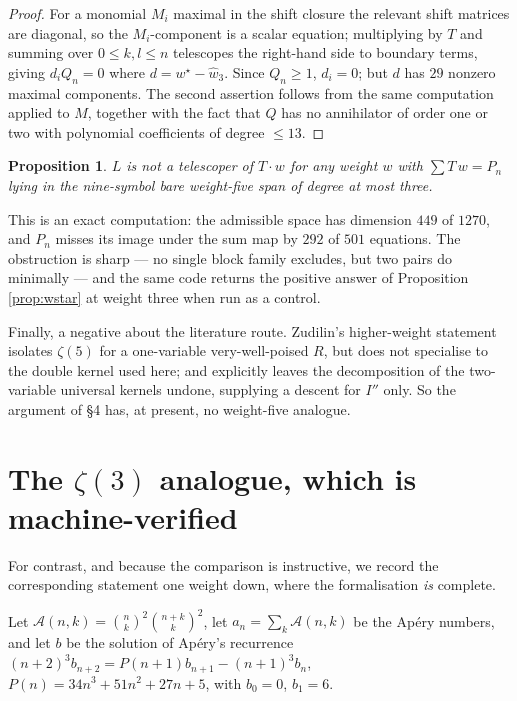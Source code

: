 \documentclass[11pt,a4paper]{amsart}
\theoremstyle{plain}
\newtheorem{proposition}[theorem]{Proposition}
\theoremstyle{definition}
\theoremstyle{remark}
\newcommand{\T}{T}
\begin{document}
\begin{proof}
For a monomial $M_i$ maximal in the shift closure the relevant shift matrices are diagonal, so
the $M_i$-component is a scalar equation; multiplying by $\T$ and summing over
$0\le k,l\le n$ telescopes the right-hand side to boundary terms, giving $d_iQ_n=0$ where
$d=w^\star-\widehat w_3$. Since $Q_n\ge1$, $d_i=0$; but $d$ has $29$ nonzero maximal components.
The second assertion follows from the same computation applied to $M$, together with the fact
that $Q$ has no annihilator of order one or two with polynomial coefficients of degree $\le13$.
\end{proof}

\begin{proposition}\label{prop:w5}
$L$ is not a telescoper of $\T\cdot w$ for any weight $w$ with $\sum\T\,w=P_n$ lying in the
nine-symbol bare weight-five span of degree at most three.
\end{proposition}

This is an exact computation: the admissible space has dimension $449$ of $1270$, and $P_n$
misses its image under the sum map by $292$ of $501$ equations. The obstruction is sharp --- no
single block family excludes, but two pairs do minimally --- and the same code returns the
positive answer of Proposition \ref{prop:wstar} at weight three when run as a control.

Finally, a negative about the literature route. Zudilin's higher-weight
statement \cite[Lemma 19]{Zu02} isolates $\zeta(5)$ for a one-variable very-well-poised $R$,
but does not specialise to the double kernel used here; and \cite{BZ} explicitly leaves the
decomposition of the two-variable universal kernels undone, supplying a descent for $I''$ only.
So the argument of \S4 has, at present, no weight-five analogue.

\section{The $\zeta(3)$ analogue, which is machine-verified}\label{sec:z3}

For contrast, and because the comparison is instructive, we record the corresponding statement
one weight down, where the formalisation \emph{is} complete.

Let $\mathcal A(n,k)=\binom nk^2\binom{n+k}k^2$, let $a_n=\sum_k\mathcal A(n,k)$ be the Ap\'ery
numbers, and let $b$ be the solution of Ap\'ery's recurrence
$(n+2)^3b_{n+2}=P(n+1)b_{n+1}-(n+1)^3b_n$, $P(n)=34n^3+51n^2+27n+5$, with $b_0=0$, $b_1=6$.
\end{document}
